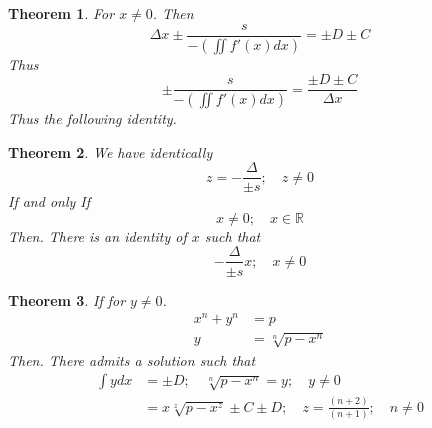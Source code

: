 \documentclass[11pt, a4paper]{article}
\theoremstyle{plain}
\newtheorem{theorem}{Theorem}[section]
\theoremstyle{definition}
\theoremstyle{remark}
\begin{document}
\begin{theorem}
For $x\neq 0$. Then
\begin{equation}
  \Delta x \pm \frac{s}{-(\iint f'(x) dx)} = \pm D \pm C 
\end{equation}
Thus
\begin{equation}
  \pm \frac{s}{-(\iint f'(x) dx)} = \frac{\pm D \pm C}{\Delta x }
\end{equation}
Thus the following identity.
\end{theorem}

\begin{theorem}
We have identically
\begin{equation}
  z = -\frac{\Delta}{\pm s}; \quad z \neq 0
\end{equation}
If and only If
\begin{equation}
  x \neq 0; \quad x \in \mathbb{R}
\end{equation}
Then. There is an identity of $x$ such that
\begin{equation}
  -\frac{\Delta}{\pm s}x; \quad x \neq 0
\end{equation}
\end{theorem}

\begin{theorem}
If for $y \neq 0$.
\begin{align*}
x^n + y^n &= p \\
y &= \sqrt[n]{p - x^n}
\end{align*}
Then. There admits a solution such that
\begin{align*}
  \int y dx &= \pm D; \quad \sqrt[n]{p - x^n} = y; \quad y \neq 0 \\
  &= x\sqrt[z]{p - x^{z}} \pm C \pm D; \quad z = \frac{(n+2)}{(n+1)}; \quad n \neq 0
\end{align*}
\end{theorem}
\end{document}
